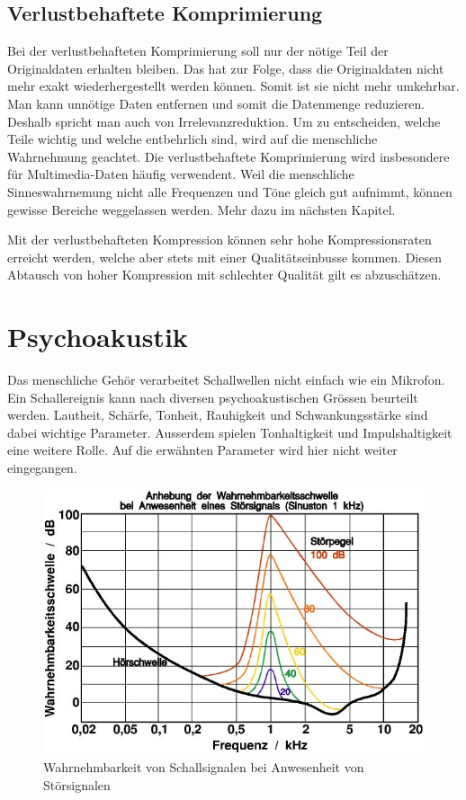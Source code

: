 \begin{refsection}
\subsection{Verlustbehaftete Komprimierung}
Bei der verlustbehafteten Komprimierung soll nur der nötige Teil der Originaldaten erhalten bleiben.
Das hat zur Folge, dass die Originaldaten nicht mehr exakt wiederhergestellt werden können. 
Somit ist sie nicht mehr umkehrbar.
Man kann unnötige Daten entfernen und somit die Datenmenge reduzieren.
Deshalb spricht man auch von Irrelevanzreduktion.
Um zu entscheiden, welche Teile wichtig und welche entbehrlich sind, wird auf die menschliche Wahrnehmung geachtet.
Die verlustbehaftete Komprimierung wird insbesondere für Multimedia-Daten häufig verwendent.
Weil die menschliche Sinneswahrnemung nicht alle Frequenzen und Töne gleich gut aufnimmt, können gewisse Bereiche weggelassen werden.
Mehr dazu im nächsten Kapitel.

Mit der verlustbehafteten Kompression können sehr hohe Kompressionsraten erreicht werden, welche aber stets mit einer Qualitätseinbusse kommen.
Diesen Abtausch von hoher Kompression mit schlechter Qualität gilt es abzuschätzen.

\section{Psychoakustik}
Das menschliche Gehör verarbeitet Schallwellen nicht einfach wie ein Mikrofon.
Ein Schallereignis kann nach diversen psychoakustischen Grössen beurteilt werden.
Lautheit, Schärfe, Tonheit, Rauhigkeit und Schwankungsstärke sind dabei wichtige Parameter.
Ausserdem spielen Tonhaltigkeit und Impulshaltigkeit eine weitere Rolle.
Auf die erwähnten Parameter wird hier nicht weiter eingegangen.

\begin{figure}[h]
	\centering
	\includegraphics[width=0.6\linewidth]{papers/compress/Bilder/Akustik_Mithoerschwelle2}
	\caption{Wahrnehmbarkeit von Schallsignalen bei Anwesenheit von Störsignalen \cite{skript:Akustik2}}
	\label{fig: Wahrnehmbarkeitsschwelle}
\end{figure}


\end{refsection}
